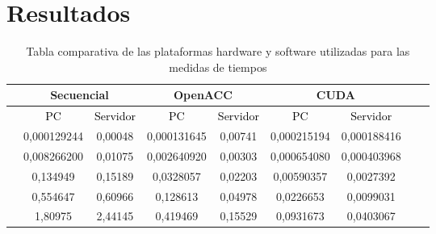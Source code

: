 \chapter{Resultados}
\begin{table}[H]
    \centering
    \begin{adjustbox}{max height=\textheight,max width=\textwidth}
    \begin{tabular}{|ccccccccc|} 
    \hline
    \rowcolor{white} \multicolumn{1}{|l}{size}  & \multicolumn{2}{c}{Secuencial}      & \multicolumn{2}{c}{OpenACC}  & \multicolumn{2}{c}{CUDA}  \\  
    \hline
    \rowcolor{white} \multicolumn{1}{|l}{}   & \textcolor{black}{PC}         & \textcolor{black}{Servidor} & \textcolor{black}{PC}         & \textcolor{black}{Servidor} & \textcolor{black}{PC}         & \textcolor{black}{Servidor} \\  
    \hline   
    \rowcolor{white} \multicolumn{1}{|l}{$128^2$}   &0,000129244   &0,00048 &0,000131645&0,00741 & 0,000215194 &0,000188416&\\
    \hline
    \rowcolor{white} \multicolumn{1}{|l}{$1024^2$}   &0,008266200    &0,01075 &0,002640920 &0,00303 & 0,000654080 &0,000403968&\\
    \hline
    \rowcolor{white} \multicolumn{1}{|l}{$4096^2$}   &0,134949   &0,15189 &0,0328057 &0,02203 &0,00590357 &0,0027392&\\
    \hline
    \rowcolor{white} \multicolumn{1}{|l}{$8192^2$}   &0,554647  &0,60966 &0,128613 &0,04978 &0,0226653 &0,0099031&\\
    \hline
    \rowcolor{white} \multicolumn{1}{|l}{$16384^2$}   &1,80975  &2,44145 &0,419469 &0,15529 &0,0931673 &0,0403067&\\
    \hline
    \end{tabular}
    \end{adjustbox}
    \caption{Tabla comparativa de las plataformas hardware y software utilizadas para las medidas de tiempos}
    \label{fig:Resultados2D}
\end{table}
